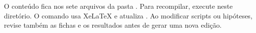 O conteúdo fica nos sete arquivos da pasta . Para recompilar, execute  neste diretório. O comando usa XeLaTeX e atualiza . Ao modificar scripts ou hipóteses, revise também as fichas e os resultados antes de gerar uma nova edição.
